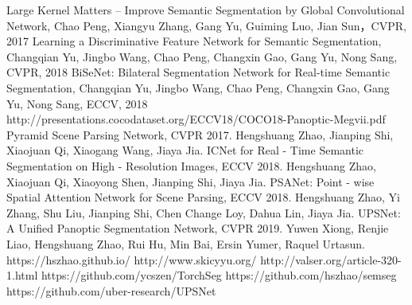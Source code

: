\documentclass[UTF8, a4paper]{ctexart}
\begin{document}
\renewcommand\refname{参考文献}
\begin{thebibliography}{99}
     Large Kernel Matters -- Improve Semantic Segmentation by Global Convolutional Network, Chao Peng, Xiangyu Zhang, Gang Yu, Guiming Luo, Jian Sun，CVPR, 2017
     Learning a Discriminative Feature Network for Semantic Segmentation, Changqian Yu, Jingbo Wang, Chao Peng, Changxin Gao, Gang Yu, Nong Sang, CVPR, 2018
     BiSeNet: Bilateral Segmentation Network for Real-time Semantic Segmentation, Changqian Yu, Jingbo Wang, Chao Peng, Changxin Gao, Gang Yu, Nong Sang, ECCV, 2018
     http://presentations.cocodataset.org/ECCV18/COCO18-Panoptic-Megvii.pdf
     Pyramid Scene Parsing Network, CVPR 2017. Hengshuang Zhao, Jianping Shi, Xiaojuan Qi, Xiaogang Wang, Jiaya Jia.
     ICNet for Real - Time Semantic Segmentation on High - Resolution Images, ECCV 2018. Hengshuang Zhao, Xiaojuan Qi, Xiaoyong Shen, Jianping Shi, Jiaya Jia.
     PSANet: Point - wise Spatial Attention Network for Scene Parsing, ECCV 2018. Hengshuang Zhao, Yi Zhang, Shu Liu, Jianping Shi, Chen Change Loy, Dahua Lin, Jiaya Jia.
     UPSNet: A Unified Panoptic Segmentation Network, CVPR 2019. Yuwen Xiong, Renjie Liao, Hengshuang Zhao, Rui Hu, Min Bai, Ersin Yumer, Raquel Urtasun.
     https://hszhao.github.io/
     http://www.skicyyu.org/
     http://valser.org/article-320-1.html
     https://github.com/ycszen/TorchSeg
     https://github.com/hszhao/semseg
     https://github.com/uber-research/UPSNet
\end{thebibliography}


\ifx\allfiles\undefined
\end{document}
